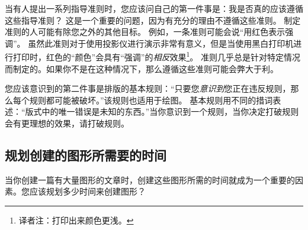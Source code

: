 当有人提出一系列指导准则时，您应该问自己的第一件事是：我是否真的应该遵循这些指导准则？ 这是一个重要的问题，因为有充分的理由不遵循这些准则。 制定准则的人可能有除您之外的其他目标。 例如，一条准则可能会说``用红色表示强调''。 虽然此准则对于使用投影仪进行演示非常有意义，但是当使用黑白打印机进行打印时，红色的``颜色''会具有``强调''的\emph{相反}效果\footnote[1]{译者注：打印出来颜色更浅。}。 准则几乎总是针对特定情况而制定的。如果你不是在这种情况下，那么遵循这些准则可能会弊大于利。


您应该意识到的第二件事是排版的基本规则：``只要您\emph{意识到}您正在违反规则，那么每个规则都可能被破坏。''该规则也适用于绘图。 基本规则用不同的措词表述：``版式中的唯一错误是未知的东西。''当你意识到一个规则，当你决定打破规则会有更理想的效果，请打破规则。


\subsection{规划创建的图形所需要的时间}


当你创建一篇有大量图形的文章时，创建这些图形所需的时间就成为一个重要的因素。您应该规划多少时间来创建图形？


